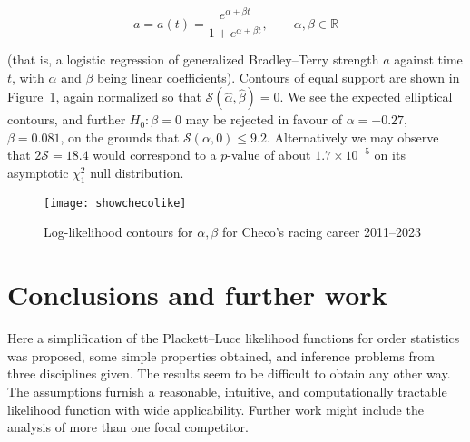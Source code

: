 \documentclass[article]{ajs}
\begin{document}
\begin{equation}
  a = a(t) = \frac{e^{\alpha + \beta t}}{1+e^{\alpha + \beta t}},\qquad\alpha,\beta\in\mathbb{R}
\end{equation}

(that is, a logistic regression of generalized Bradley--Terry strength
$a$ against time $t$, with $\alpha$ and $\beta$ being linear
coefficients).  Contours of equal support are shown in
Figure~\ref{showchecolike}, again normalized so that
$\mathcal{S}(\hat{\alpha},\hat{\beta})=0$.  We see the expected
elliptical contours, and further $H_0\colon\beta=0$ may be rejected in
favour of $\alpha=-0.27$, $\beta=0.081$, on the grounds that
$\mathcal{S}(\alpha,0)\leqslant 9.2$.  Alternatively we may observe
that $2\mathcal{S}=18.4$ would correspond to a $p$-value of about
$1.7\times 10^{-5}$ on its asymptotic $\chi^2_1$ null distribution.

\begin{figure}[t]
  \begin{centering}
\texttt{[image: showchecolike]}  %
\caption{Log-likelihood contours for $\alpha,\beta$ for Checo's racing
  career 2011--2023\label{showchecolike}}
\end{centering}
\end{figure}

\section{Conclusions and further work}

Here a simplification of the Plackett--Luce likelihood functions for
order statistics was proposed, some simple properties obtained, and
inference problems from three disciplines given.  The results seem to
be difficult to obtain any other way.  The assumptions furnish a
reasonable, intuitive, and computationally tractable likelihood
function with wide applicability.  Further work might include the
analysis of more than one focal competitor.




%

\end{document}
